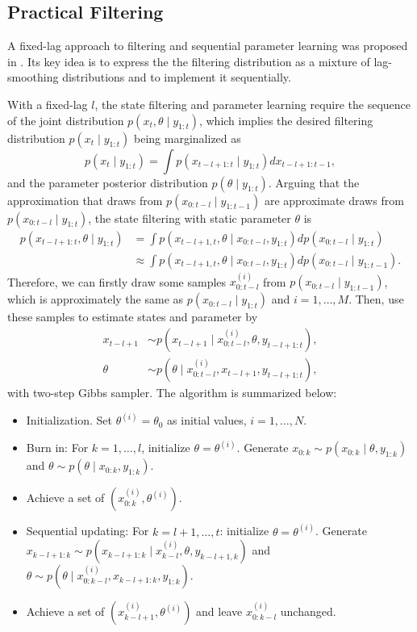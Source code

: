 \subsection{Practical Filtering}

A fixed-lag approach to filtering and sequential parameter learning was proposed in \cite{polson2008practical}. Its key idea is to express the the filtering distribution as a mixture of lag-smoothing distributions and to implement it sequentially. 

With a fixed-lag $l$, the state filtering and parameter learning require the sequence of the joint distribution $p(x_t,\theta\mid y_{1:t})$, which implies the desired filtering distribution $p(x_t\mid y_{1:t})$ being marginalized as 
\begin{equation*}
p(x_t\mid y_{1:t}) = \int p(x_{t-l+1:t}\mid y_{1:t}) dx_{t-l+1:t-1},
\end{equation*}
and the parameter posterior distribution $p(\theta\mid y_{1:t})$. Arguing that the approximation that draws from $p(x_{0:t-l}\mid y_{1:t-1})$ are approximate draws from $p(x_{0:t-l}\mid y_{1:t})$, the state filtering with static parameter $\theta$ is 
\begin{align*}
p(x_{t-l+1:t},\theta\mid y_{1:t}) &=\int p(x_{t-l+1,t},\theta \mid x_{0:t-l},y_{1:t}) dp(x_{0:t-l}\mid y_{1:t}) \\
&\approx \int p(x_{t-l+1,t},\theta \mid x_{0:t-l},y_{1:t}) dp(x_{0:t-l}\mid y_{1:t-1}).
\end{align*}
Therefore, we can firstly draw some samples $x_{0:t-l}^{(i)}$ from $p(x_{0:t-l}\mid y_{1:t-1})$, which is approximately the same as $p(x_{0:t-l}\mid y_{1:t})$ and $i=1,\dots,M$. Then, use these samples to estimate states and parameter by 
\begin{align*}
x_{t-l+1} &\sim p(x_{t-l+1}\mid x_{0:t-l}^{(i)},\theta,y_{t-l+1:t}),\\
\theta &\sim p(\theta \mid x_{0:t-l}^{(i)},x_{t-l+1},y_{t-l+1:t}),
\end{align*}
with two-step Gibbs sampler. The algorithm is summarized below:

\begin{itemize}
\item Initialization. Set $\theta^{(i)}=\theta_0$ as initial values, $i=1,\dots,N$. 
\item Burn in: For $k=1,\dots,l$, initialize $\theta = \theta^{(i)}$. Generate $x_{0:k}\sim p(x_{0:k}\mid \theta,y_{1:k})$ and $\theta \sim p(\theta\mid x_{0:k},y_{1:k})$.
\item Achieve a set of $\left( x_{0:k}^{(i)},\theta^{(i)}\right)$.
\item Sequential updating: For $k=l+1,\dots,t$: initialize $\theta = \theta^{(i)}$. Generate $x_{k-l+1:k}\sim p(x_{k-l+1:k}\mid x_{k-l}^{(i)},\theta,y_{k-l+1,k})$ and $\theta \sim p(\theta\mid x_{0:k-l}^{(i)},x_{k-l+1:k},y_{1:k})$. 
\item Achieve a set of $\left( x_{k-l+1}^{(i)},\theta^{(i)}\right)$ and leave $x_{0:k-l}^{(i)}$ unchanged. 
\end{itemize}

